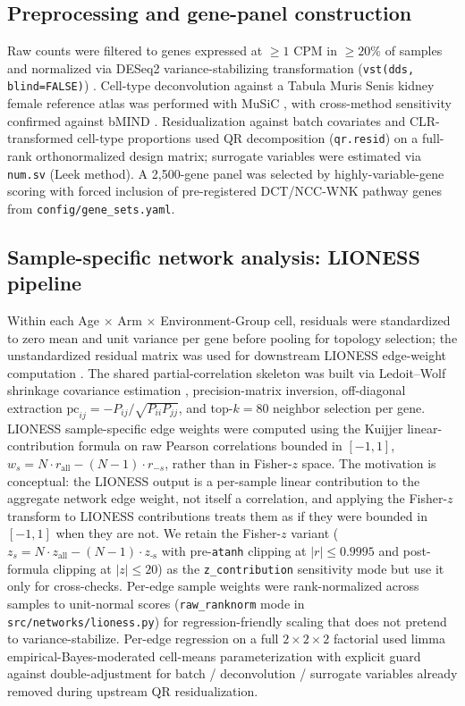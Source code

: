 \documentclass[11pt]{article}
\newcommand{\code}[1]{\texttt{#1}}
\newcommand{\pkg}[1]{\textsf{#1}}
\begin{document}
\subsection{Preprocessing and gene-panel construction}

Raw counts were filtered to genes expressed at $\geq 1$ CPM in $\geq 20\%$ of samples \citep{robinson2010edger} and normalized via DESeq2 variance-stabilizing transformation (\code{vst(dds, blind=FALSE)}) \citep{love2014moderated}. Cell-type deconvolution against a Tabula Muris Senis kidney female reference atlas \citep{tabula2020} was performed with \pkg{MuSiC} \citep{wang2019music}, with cross-method sensitivity confirmed against bMIND \citep{wang2021bayesian}. Residualization against batch covariates and CLR-transformed cell-type proportions used QR decomposition (\code{qr.resid}) on a full-rank orthonormalized design matrix; surrogate variables were estimated via \code{num.sv} (Leek method). A 2,500-gene panel was selected by highly-variable-gene scoring with forced inclusion of pre-registered DCT/NCC-WNK pathway genes from \code{config/gene\_sets.yaml}.

\subsection{Sample-specific network analysis: LIONESS pipeline}

Within each Age $\times$ Arm $\times$ Environment-Group cell, residuals were standardized to zero mean and unit variance per gene before pooling for topology selection; the unstandardized residual matrix was used for downstream LIONESS edge-weight computation \citep{kuijjer2019estimating}. The shared partial-correlation skeleton was built via Ledoit--Wolf shrinkage covariance estimation \citep{ledoit2003honey}, precision-matrix inversion, off-diagonal extraction $\mathrm{pc}_{ij} = -P_{ij}/\sqrt{P_{ii}P_{jj}}$, and top-$k{=}80$ neighbor selection per gene. LIONESS sample-specific edge weights were computed using the Kuijjer linear-contribution formula on raw Pearson correlations bounded in $[-1, 1]$, $w_s = N \cdot r_{\text{all}} - (N-1) \cdot r_{-s}$, rather than in Fisher-$z$ space. The motivation is conceptual: the LIONESS output is a per-sample linear contribution to the aggregate network edge weight, not itself a correlation, and applying the Fisher-$z$ transform to LIONESS contributions treats them as if they were bounded in $[-1, 1]$ when they are not. We retain the Fisher-$z$ variant ($z_s = N \cdot z_{\text{all}} - (N-1) \cdot z_{\text{-s}}$ with pre-\code{atanh} clipping at $|r| \leq 0.9995$ and post-formula clipping at $|z| \leq 20$) as the \code{z\_contribution} sensitivity mode but use it only for cross-checks. Per-edge sample weights were rank-normalized across samples to unit-normal scores (\code{raw\_ranknorm} mode in \code{src/networks/lioness.py}) for regression-friendly scaling that does not pretend to variance-stabilize. Per-edge regression on a full $2\times 2\times 2$ factorial used limma empirical-Bayes-moderated cell-means parameterization \citep{ritchie2015limma} with explicit guard against double-adjustment for batch / deconvolution / surrogate variables already removed during upstream QR residualization.
\end{document}
